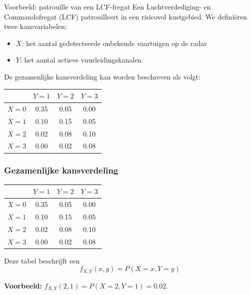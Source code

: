     \begin{frame}{Voorbeeld: patrouille van een LCF-fregat}
        Een Luchtverdediging- en Commandofregat (LCF) patrouilleert in een risicovol kustgebied.
        We definiëren twee kansvariabelen: 
        \begin{itemize}
            \item $X$: het aantal gedetecteerde onbekende vaartuigen op de radar
            \item $Y$: het aantal actieve vuurleidingskanalen
        \end{itemize}

        De gezamenlijke kansverdeling kan worden beschreven als volgt:
        {\small
            \begin{center}
                \begin{tabular}{c|ccc}
                    \toprule
                            & $Y=1$ & $Y=2$ & $Y=3$ \\
                    \midrule
                        $X=0$   & 0.35 & 0.05 & 0.00 \\
                        $X=1$   & 0.10 & 0.15 & 0.05 \\
                        $X=2$   & 0.02 & 0.08 & 0.10 \\
                        $X=3$   & 0.00 & 0.02 & 0.08 \\
                    \bottomrule
                \end{tabular}
            \end{center}
        }
    \end{frame}

    \begin{frame}\frametitle{Gezamenlijke kansverdeling}
        {\small
            \begin{center}
                \begin{tabular}{c|ccc}
                    \toprule
                            & $Y=1$ & $Y=2$ & $Y=3$ \\
                    \midrule
                        $X=0$   & 0.35 & 0.05 & 0.00 \\
                        $X=1$   & 0.10 & 0.15 & 0.05 \\
                        $X=2$   & 0.02 & 0.08 & 0.10 \\
                        $X=3$   & 0.00 & 0.02 & 0.08 \\
                    \bottomrule
                \end{tabular}
            \end{center}
        }
        Deze tabel beschrijft een  
        \[
            f_{X,Y}(x,y) = P(X = x, Y = y)
        \]

        \vfill

        \textbf{Voorbeeld:} $f_{X,Y}(2, 1) = P(X=2, Y=1) = 0.02$.       

    \end{frame}

